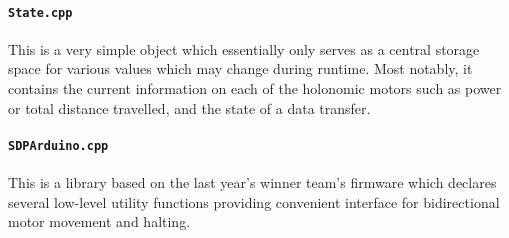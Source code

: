 \paragraph{\texttt{State.cpp}} This is a very simple object which essentially only serves as a central storage space for various values which may change during runtime. Most notably, it contains the current information on each of the holonomic motors such as power or total distance travelled, and the state of a data transfer.

\paragraph{\texttt{SDPArduino.cpp}} This is a library based on the last year's winner team's firmware which declares several low-level utility functions providing convenient interface for bidirectional motor movement and halting.